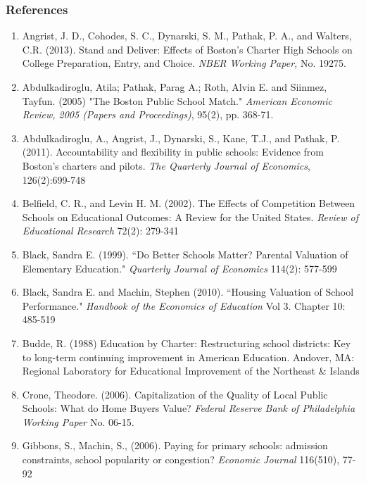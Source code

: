 \documentclass{beamer}
\begin{document}
\begin{frame}
\fontsize{2}{1}
\frametitle{References}
 \begin{enumerate}
	\item Angrist, J. D., Cohodes, S. C., Dynarski, S. M., Pathak, P. A., and Walters, C.R. (2013). Stand and Deliver: Effects of Boston's Charter High Schools on College Preparation, Entry, and Choice. {\em NBER Working Paper,} No. 19275. 
	
	\item Abdulkadiroglu, Atila; Pathak, Parag A.; Roth, Alvin E. and Siinmez, Tayfun. (2005) "The Boston Public School Match." \textit{American Economic Review, 2005 (Papers and Proceedings)}, 95(2), pp. 368-71. 

	
	\item Abdulkadiroglu, A., Angrist, J., Dynarski, S., Kane, T.J., and Pathak, P. (2011). Accountability and flexibility in public schools: Evidence from Boston's charters and pilots. \textit{The Quarterly Journal of Economics}, 126(2):699-748
	
	\item Belfield, C. R., and Levin H. M. (2002). The Effects of Competition Between Schools on Educational Outcomes: A Review for the United States. \textit{Review of Educational Research} 72(2): 279-341

	\item Black, Sandra E. (1999). ``Do Better Schools Matter? Parental Valuation of Elementary Education." \textit{Quarterly Journal of Economics} 114(2): 577-599
	
	\item Black, Sandra E. and Machin, Stephen (2010). ``Housing Valuation of School Performance." \textit{Handbook of the Economics of Education} Vol 3. Chapter 10: 485-519
	
	\item Budde, R. (1988) Education by Charter: Restructuring school districts: Key to long-term continuing improvement in American Education. Andover, MA: Regional Laboratory for Educational Improvement of the Northeast \& Islands
	
	\item Crone, Theodore. (2006). Capitalization of the Quality of Local Public Schools: What do Home Buyers Value? \textit{Federal Reserve Bank of Philadelphia Working Paper} No. 06-15.
	
	\item Gibbons, S., Machin, S., (2006). Paying for primary schools: admission constraints, school popularity or congestion? \textit{Economic Journal} 116(510), 77-92
	

\end{enumerate}
\end{frame}
\end{document}

